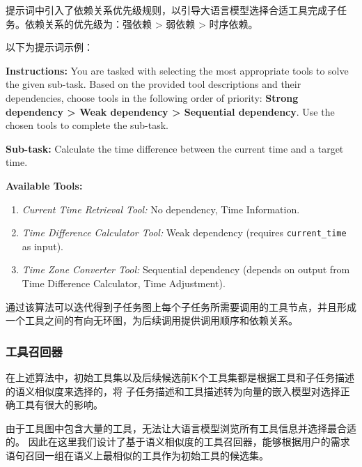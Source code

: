 提示词中引入了依赖关系优先级规则，以引导大语言模型选择合适工具完成子任务。依赖关系的优先级为：强依赖 > 弱依赖 > 时序依赖。

以下为提示词示例：


\begin{center}
\begin{tcolorbox}[colback=bgcolor, colframe=black, width=0.85\textwidth, boxrule=0.5mm, coltitle=white, colbacktitle=titlecolor, title=Example Prompt for Tool Selection]

\textbf{Instructions:} You are tasked with selecting the most appropriate tools to solve the given sub-task. Based on the provided tool descriptions and their dependencies, choose tools in the following order of priority: \textbf{Strong dependency > Weak dependency > Sequential dependency}. Use the chosen tools to complete the sub-task.

\textbf{Sub-task:} Calculate the time difference between the current time and a target time.

\textbf{Available Tools:}
\begin{enumerate}
    \item \textit{Current Time Retrieval Tool:} No dependency, Time Information.
    \item \textit{Time Difference Calculator Tool:} Weak dependency (requires \texttt{current\_time} as input).
    \item \textit{Time Zone Converter Tool:} Sequential dependency (depends on output from Time Difference Calculator, Time Adjustment).
\end{enumerate}

\end{tcolorbox}
\end{center}

通过该算法可以迭代得到子任务图上每个子任务所需要调用的工具节点，并且形成一个工具之间的有向无环图，为后续调用提供调用顺序和依赖关系。

\subsubsection{工具召回器}

在上述算法中，初始工具集以及后续候选前K个工具集都是根据工具和子任务描述的语义相似度来选择的，将
子任务描述和工具描述转为向量的嵌入模型对选择正确工具有很大的影响。

由于工具图中包含大量的工具，无法让大语言模型浏览所有工具信息并选择最合适的。
因此在这里我们设计了基于语义相似度的工具召回器，能够根据用户的需求语句召回一组在语义上最相似的工具作为初始工具的候选集。

